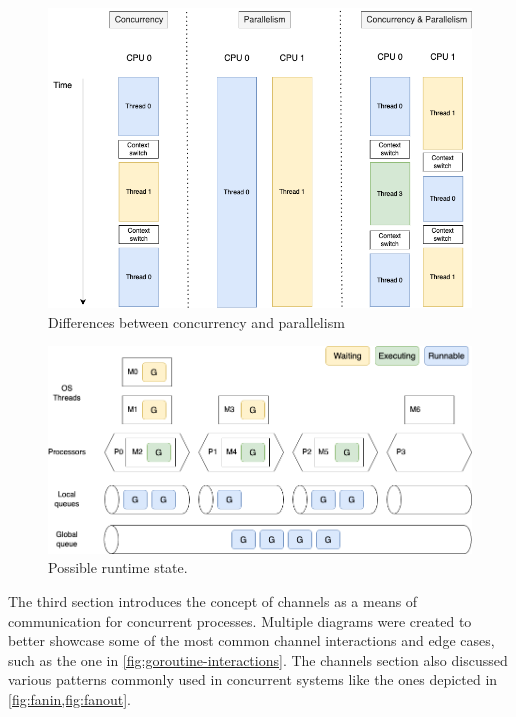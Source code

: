 \documentclass[
  digital,
  color,
  oneside,
  nosansbold,
  nocolorbold,
  nolof,
  nolot,
]{fithesis4}
\begin{document}
\begin{figure}[H]
    \centering
    \includegraphics[width=12cm]{figures/concurrency-parallelism.png}
    \caption{Differences between concurrency and parallelism}
    \label{fig:con-vs-par}
\end{figure}

\begin{figure}[H]
    \centering
    \includegraphics[width=12cm]{figures/scheduling.png}
    \caption{Possible runtime state.}
    \label{fig:runtime}
\end{figure}

The third section introduces the concept of channels as a means of communication for concurrent processes. Multiple diagrams were created to better showcase some of the most common channel interactions and edge cases, such as the one in \cref{fig:goroutine-interactions}. The channels section also discussed various patterns commonly used in concurrent systems like the ones depicted in \cref{fig:fanin,fig:fanout}.
\end{document}
